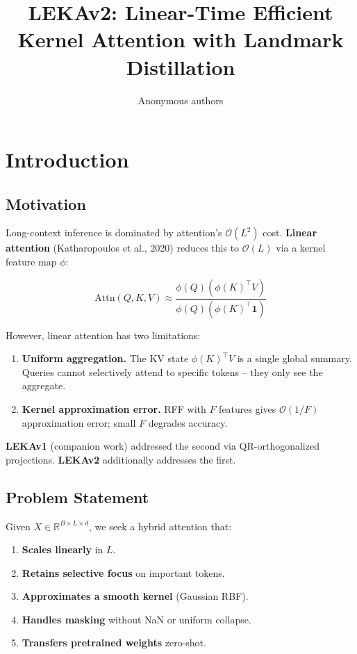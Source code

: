 \title{\textbf{LEKAv2: Linear-Time Efficient Kernel Attention with Landmark Distillation}}

\author{Anonymous authors}


\section{Introduction}

\subsection{Motivation}

Long-context inference is dominated by attention's $\mathcal{O}(L^2)$ cost. 
\textbf{Linear attention} (Katharopoulos et al., 2020) reduces this to 
$\mathcal{O}(L)$ via a kernel feature map $\phi$:

\[
\text{Attn}(Q, K, V) \approx \frac{\phi(Q)(\phi(K)^\top V)}{\phi(Q)(\phi(K)^\top \mathbf{1})}
\tag{1.1}
\]

However, linear attention has two limitations:

\begin{enumerate}
\item \textbf{Uniform aggregation.} The KV state $\phi(K)^\top V$ is a single global
  summary. Queries cannot selectively attend to specific tokens -- they
  only see the aggregate.
\item \textbf{Kernel approximation error.} RFF with $F$ features gives $\mathcal{O}(1/F)$
  approximation error; small $F$ degrades accuracy.

\end{enumerate}
\textbf{LEKAv1} (companion work) addressed the second via QR-orthogonalized 
projections. \textbf{LEKAv2} additionally addresses the first.

\subsection{Problem Statement}

Given $X \in \mathbb{R}^{B \times L \times d}$, we seek a hybrid attention 
that:

\begin{enumerate}
\item \textbf{Scales linearly} in $L$.
\item \textbf{Retains selective focus} on important tokens.
\item \textbf{Approximates a smooth kernel} (Gaussian RBF).
\item \textbf{Handles masking} without NaN or uniform collapse.
\item \textbf{Transfers pretrained weights} zero-shot.

\end{enumerate}
